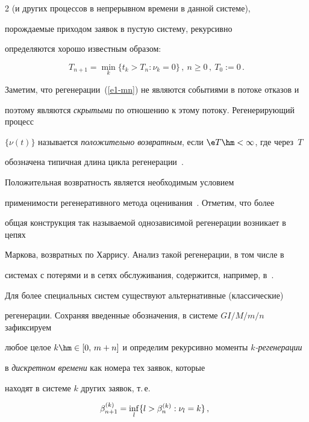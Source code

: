 \begin{multicols}{2}
(и других процессов в непрерывном времени в данной сис\-те\-ме),


по\-рож\-да\-емые приходом заявок в пустую сис\-те\-му, рекурсивно


определяются хорошо известным образом: 


\begin{equation}


T_{n+1}=\min\limits_k\{t_k>T_n: \nu_k=0\}\,, \ n \ge 0\,,\ T_0:=0\,.


\label{e1-mn} 


\end{equation} 


Заметим, что регенерации~(\ref{e1-mn}) не являются событиями в потоке отказов и 


поэтому являются \emph{скрытыми} по отношению к этому потоку. Регенерирующий процесс


$\{\nu(t)\}$ называется {\it положительно возвратным}, если $\e T\hm<\infty$, где через~$T$ 


обозначена типичная длина цикла регенерации~\cite{Wolff, Morozov2004}.


 Положительная возвратность является необходимым условием


применимости регенеративного метода оценивания~\cite{Asmus}. Отметим, что более


общая конструкция так называемой однозависимой регенерации возникает в цепях


Маркова, возвратных по Харрису. Анализ такой регенерации, в том числе в


сис\-те\-мах с потерями и в  сетях обслуживания, содержится, например, в~\cite{Sig2, Sig3}.





Для  более специальных систем существуют альтернативные (классические)


регенерации. Со\-хра\-няя введенные обозначения, в сис\-те\-ме $GI/M/m/n$ зафиксируем


любое целое $k\hm\in [0,\, m+n]$ и определим рекурсивно моменты  {\it $k$-ре\-ге\-не\-ра\-ции} 


в {\it дискретном времени}  как номера тех заявок, которые


находят  в системе $k$ других заявок, т.\,е.\ 


 \begin{equation}


\beta^{(k)}_{n+1}=\inf_l\{l>\beta^{(k)}_{n}: \nu_l=k\}\,, \enskip



\end{equation}
\end{multicols}
